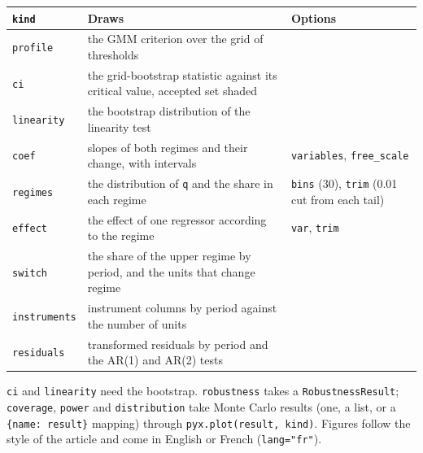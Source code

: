 \documentclass[
  10.5pt,
  a4paper,
]{article}
\newcounter{none} %
\begin{document}
{\def\LTcaptype{none} %
\begin{longtable}[]{@{}
  >{\raggedright\arraybackslash}p{}
  >{\raggedright\arraybackslash}p{}
  >{\raggedright\arraybackslash}p{}@{}}
\toprule\noalign{}
\begin{minipage}[b]{\linewidth}\raggedright
\texttt{kind}
\end{minipage} & \begin{minipage}[b]{\linewidth}\raggedright
Draws
\end{minipage} & \begin{minipage}[b]{\linewidth}\raggedright
Options
\end{minipage} \\
\midrule\noalign{}
\endhead
\bottomrule\noalign{}
\endlastfoot
\texttt{profile} & the GMM criterion over the grid of thresholds & \\
\texttt{ci} & the grid-bootstrap statistic against its critical value,
accepted set shaded & \\
\texttt{linearity} & the bootstrap distribution of the linearity test
& \\
\texttt{coef} & slopes of both regimes and their change, with intervals
& \texttt{variables}, \texttt{free\_scale} \\
\texttt{regimes} & the distribution of \texttt{q} and the share in each
regime & \texttt{bins} (30), \texttt{trim} (0.01 cut from each tail) \\
\texttt{effect} & the effect of one regressor according to the regime &
\texttt{var}, \texttt{trim} \\
\texttt{switch} & the share of the upper regime by period, and the units
that change regime & \\
\texttt{instruments} & instrument columns by period against the number
of units & \\
\texttt{residuals} & transformed residuals by period and the AR(1) and
AR(2) tests & \\
\end{longtable}
}

\texttt{ci} and \texttt{linearity} need the bootstrap.
\texttt{robustness} takes a \texttt{RobustnessResult};
\texttt{coverage}, \texttt{power} and \texttt{distribution} take Monte
Carlo results (one, a list, or a \texttt{\{name:\ result\}} mapping)
through \texttt{pyx.plot(result,\ kind)}. Figures follow the style of
the article and come in English or French (\texttt{lang="fr"}).
\end{document}

